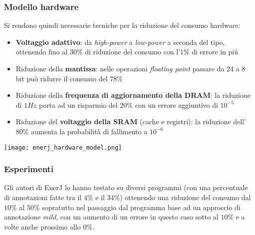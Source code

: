 \subsubsection{Modello hardware}
Si rendono quindi necessarie tecniche per la riduzione del consumo hardware:
\begin{itemize}
	\item \textbf{Voltaggio adattivo}: da \textit{high-power} a \textit{low-power} a seconda del tipo, ottenendo fino al $30\%$ di riduzione del consumo con l'$1\%$ di errore in più
	\item Riduzione della \textbf{mantissa}: nelle operazioni \textit{floating point} passare da 24 a 8 bit può ridurre il consumo del $78\%$
	\item Riduzione della \textbf{frequenza di aggiornamento della DRAM}: la riduzione di $1Hz$ porta ad un risparmio del $20\%$ con un errore aggiuntivo di  $10^{-5}$
	\item Riduzione del \textbf{voltaggio della SRAM} (cache e registri): la riduzione dell'$80\%$ aumenta la probabilità di fallimento a $10^{-6}$
\end{itemize}
\begin{center}
	\texttt{[image: enerj\_hardware\_model.png]}
\end{center}

\subsubsection{Esperimenti}
Gli autori di EnerJ lo hanno testato su diversi programmi (con una percentuale di annotazioni fatte tra il $4\%$ e il $34\%$) ottenendo una riduzione del consumo dal $10\%$ al $50\%$ sopratutto nel passaggio dal programma base ad un approccio di annotazione \textit{mild}, con un aumento di un errore in questo caso sotto al $10\%$ e a volte anche prossimo allo $0\%$.